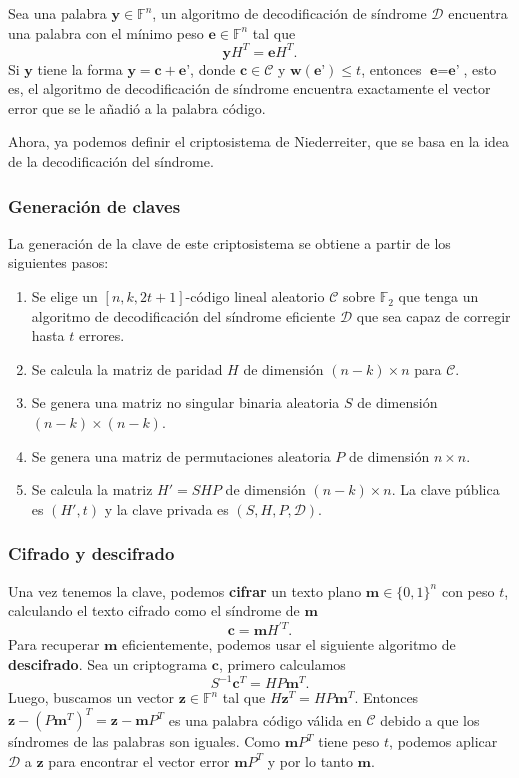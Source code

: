 Sea una palabra $\textbf{y} \in \mathbb{F}^n$, un algoritmo de decodificación de síndrome $\mathcal{D}$ encuentra una palabra con el mínimo peso $\textbf{e} \in \mathbb{F}^n$ tal que
\[
    \textbf{y} H^T = \textbf{e} H^T.
\]
Si $\textbf{y}$ tiene la forma $\textbf{y} = \textbf{c} + \textbf{e'}$, donde $\textbf{c} \in \mathcal{C}$ y $\textbf{w}(\textbf{e'}) \leq t$, entonces $\textbf{e} = \textbf{e'}$, esto es, el algoritmo de decodificación de síndrome encuentra exactamente el vector error que se le añadió a la palabra código.

Ahora, ya podemos definir el criptosistema de Niederreiter, que se basa en la idea de la decodificación del síndrome.

\subsubsection{Generación de claves}

La generación de la clave de este criptosistema se obtiene a partir de los siguientes pasos:

\begin{enumerate}
    \item Se elige un $[n, k, 2t + 1]$-código lineal aleatorio $\mathcal{C}$ sobre $\mathbb{F}_2$ que tenga un algoritmo de decodificación del síndrome eficiente $\mathcal{D}$ que sea capaz de corregir hasta $t$ errores.
    \item Se calcula la matriz de paridad $H$ de dimensión $(n - k) \times n$ para $\mathcal{C}$.
    \item Se genera una matriz no singular binaria aleatoria $S$ de dimensión $(n - k) \times (n - k)$.
    \item Se genera una matriz de permutaciones aleatoria $P$ de dimensión $n \times n$.
    \item Se calcula la matriz $H' = SHP$ de dimensión $(n - k) \times n$. La clave pública es $(H', t)$ y la clave privada es $(S, H, P, \mathcal{D})$.
\end{enumerate}

\subsubsection{Cifrado y descifrado}

Una vez tenemos la clave, podemos \textbf{cifrar} un texto plano $\textbf{m} \in \{ 0, 1 \}^n$ con peso $t$, calculando el texto cifrado como el síndrome de $\textbf{m}$
\[
    \textbf{c} = \textbf{m} H^{'T}.
\]
Para recuperar $\textbf{m}$ eficientemente, podemos usar el siguiente algoritmo de \textbf{descifrado}. Sea un criptograma $\textbf{c}$, primero calculamos
\[
    S^{-1} \textbf{c}^T = H P \textbf{m}^T.
\]
Luego, buscamos un vector $\textbf{z} \in \mathbb{F}^n$ tal que $H \textbf{z}^T = HP \textbf{m}^T$. Entonces $\textbf{z} - (P\textbf{m}^T)^T = \textbf{z} - \textbf{m}P^T$ es una palabra código válida en $\mathcal{C}$ debido a que los síndromes de las palabras son iguales. Como $\textbf{m}P^T$ tiene peso $t$, podemos aplicar $\mathcal{D}$ a $\textbf{z}$ para encontrar el vector error $\textbf{m}P^T$ y por lo tanto $\textbf{m}$.

